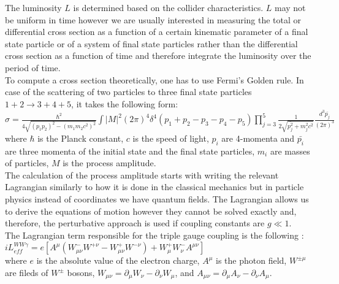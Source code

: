 
The luminosity $L$ is determined based on the collider characteristics. $L$ may not be uniform in time however we are usually interested in measuring the total or differential cross section as a function of a certain kinematic parameter of a final state particle or of a system of final state particles rather than the differential cross section as a function of time and therefore integrate the luminosity over the period of time.\\


To compute a cross section theoretically, one has to use Fermi's Golden rule. In case of the scattering of two particles to three final state particles $1+2\rightarrow 3+4+5$, it takes the following form:\\

$\sigma = \frac{ \hbar^2 }{4\sqrt{(p_1p_2)^2-(m_1m_2c^2)^2}} \int |M|^2 (2\pi)^4 \delta^4(p_1+p_2-p_3-p_4-p_5) \prod_{j=3}^{5} \frac{1}{2 \sqrt{\bar{p_j^2}+m_j^2 c^2}}\frac{d^3\bar{p_j}}{(2\pi)^3} $ \\ 
where $\hbar$ is the Planck constant, $c$ is the speed of light, $p_i$ are 4-momenta and ${\bar{p_i}}$ are three momenta of the initial state and the final state particles, $m_i$ are masses of particles, $M$ is the process amplitude.\\ 

The calculation of the process amplitude starts with writing the relevant Lagrangian similarly to how it is done in the classical mechanics but in particle physics instead of coordinates we have quantum fields. The Lagrangian allows us to derive the equations of motion however they cannot be solved exactly and, therefore, the perturbative approach is used if coupling constants are $g \ll 1$.\\

The Lagrangian term responsible for the triple gauge coupling is the following \cite{ref_theory_aTGC}:\\

$i L_{eff}^{WW\gamma}= e [ A^\mu (W_{\mu\nu}^- W^{+\nu} - W_{\mu\nu}^+ W^{-\nu}) + W_{\mu}^+ W_{\nu}^- A^{\mu\nu} ] $\\

where $e$ is the absolute value of the electron charge, $A^\mu$ is the photon field, $W^{\pm\mu}$ are fileds of $W^\pm$ bosons, $W_{\mu\nu}=\partial_\mu W_\nu - \partial_\nu W_\mu$, and $A_{\mu\nu}=\partial_\mu A_\nu - \partial_\nu A_\mu$.\\




